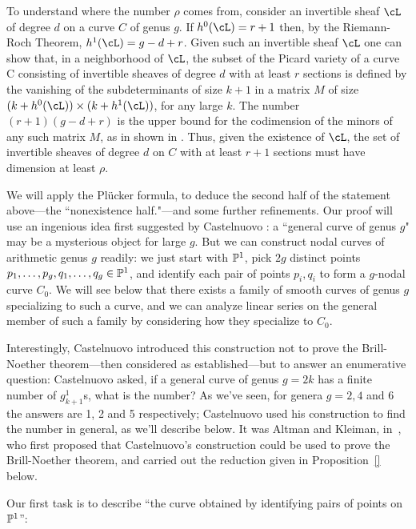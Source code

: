 To understand where the number $\rho$ comes from, consider an invertible sheaf $\cL$ of degree $d$ on a curve $C$ of genus $g$. If 
$h^0(\cL) = r+1$ then, by the Riemann-Roch Theorem, $h^1(\cL) = g-d+r$. 
Given such an invertible sheaf $\cL$ one can show that, in a neighborhood of $\cL$, the subset of the Picard variety of a curve C consisting of invertible sheaves of 
degree $d$ with at least $r$ sections is defined by the vanishing of the subdeterminants of
size $k+1$ in a matrix $M$ of size $(k+h^0(\cL) )\times (k+ h^1(\cL))$, for any large $k$. The number
$(r+1)(g-d+r)$ is the upper bound for the codimension of the minors of any such matrix $M$, as in shown in
\cite[Theorem ***]{Eisenbud}. Thus, given the existence of $\cL$, the set of invertible sheaves of degree $d$ on $C$ with at least $r+1$ sections must have dimension at least $\rho$.

We will  apply the Pl\"ucker formula, to deduce the second half of the statement above---the ``nonexistence half."---and some further refinements. 
Our proof will use an ingenious idea first suggested by Castelnuovo :
a ``general curve of genus $g$" may be a mysterious object for large $g$. But we can construct nodal curves of arithmetic genus $g$ readily: we just start with $\PP^1$, pick $2g$ distinct points $p_1,\dots,p_g, q_1,\dots,q_g \in \PP^1$, and identify each pair of points $p_i, q_i$ to form a $g$-nodal curve $C_0$. We will see below that there exists a family of smooth curves of genus $g$ specializing to such a curve, and we can analyze linear series on the general member of such a family by considering how they specialize to $C_0$.

Interestingly, Castelnuovo introduced this construction not to prove the Brill-Noether theorem---then considered as established---but to answer an enumerative question: Castelnuovo asked, if a general curve of genus $g = 2k$ has a finite number of $g^1_{k+1}$s, what is the number? As we've seen, for genera $g = 2, 4$ and 6 the answers are 1, 2 and 5 respectively; Castelnuovo used his construction to find the number in general, as we'll describe below. It was Altman and Kleiman, in~\cite{}, who first proposed that Castelnuovo's construction could be used to prove the Brill-Noether theorem, and carried out the reduction given in Proposition~\ref{} below.

Our first task is to describe ``the curve obtained by identifying pairs of points on $\PP^1$'':

